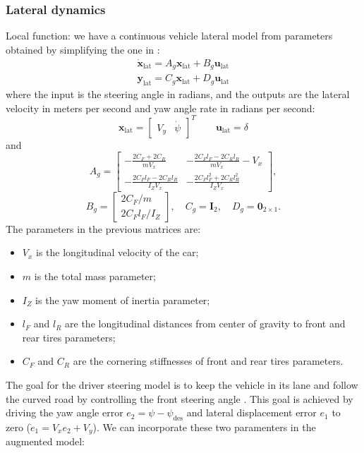 \documentclass[conference, 11pt]{IEEEtran}
\begin{document}
\subsubsection{Lateral dynamics}
Local function: we have a continuous vehicle lateral model from parameters obtained by simplifying the one in \cite{rathai}: 
\begin{equation}
\label{eqn:lateral_dynamics_simple_model}
\begin{array}{ll}
\dot{\textbf{x}}_{\text{lat}} =A_g \textbf{x}_{\text{lat}}+ B_g \textbf{u}_{\text{lat}}\\
\textbf{y}_{\text{lat}} =C_g \textbf{x}_{\text{lat}} + D_g \textbf{u}_{\text{lat}}
\end{array}
\end{equation}
where the input is the steering angle in radians, and the outputs are the lateral velocity in meters per second and yaw angle rate in radians per second:
\begin{equation*}
\textbf{x}_{\text{lat}} = \begin{bmatrix}
V_y&\dot{\psi}
\end{bmatrix}^T
\qquad
\textbf{u}_{\text{lat}} = \delta
\end{equation*}
and
\[ 
A_g=\begin{bmatrix}
-\frac{2C_F+2C_R}{mV_x}&-\frac{2C_Fl_F-2C_Rl_R}{mV_x} - V_x\\
-\frac{2C_Fl_F-2C_Rl_R}{I_ZV_x}&-\frac{2C_Fl_F^2+2C_Rl_R^2}{I_ZV_x}
\end{bmatrix},
\]
\[
B_g=\begin{bmatrix}
2C_F/m\\
2C_Fl_F/I_Z
\end{bmatrix},
\quad
C_g=\textbf{I}_2, 
\quad
D_g=\textbf{0}_{2\times1}.
\]
The parameters in the previous matrices are:
\begin{itemize}
	\item $V_x$ is the longitudinal velocity of the car;	
	\item $m$ is the total mass parameter; 
	\item $I_Z$ is the yaw moment of inertia parameter;
	\item $l_F$ and $l_R$ are the longitudinal distances from center of gravity to front and rear tires parameters;
	\item $C_F$ and $C_R$ are the cornering stiffnesses of front and rear tires parameters.
\end{itemize}
The goal for the driver steering model is to keep the vehicle in its lane and follow the curved road by controlling the front steering angle . This goal is achieved by driving the yaw angle error $e_2 = \psi -\psi_{\text{des}}$ and lateral displacement error $e_1$ to zero ($\dot{e}_1 = V_xe_2+V_y$). We can incorporate these two paramenters in the augmented model:
\end{document}
